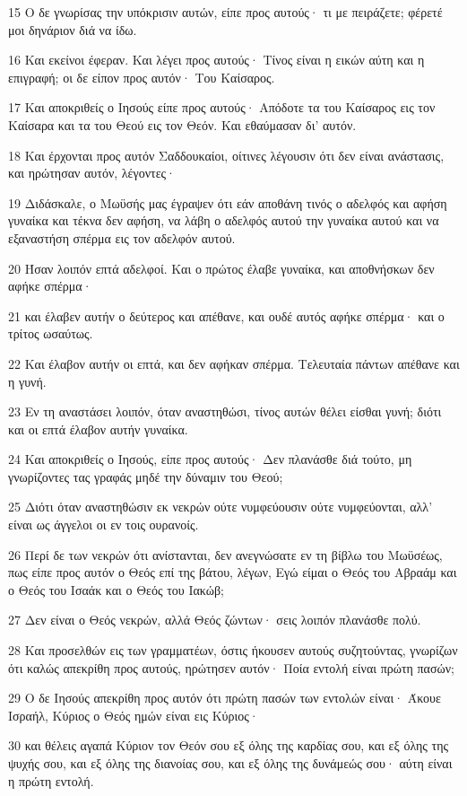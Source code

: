 \par 15 Ο δε γνωρίσας την υπόκρισιν αυτών, είπε προς αυτούς· τι με πειράζετε; φέρετέ μοι δηνάριον διά να ίδω.
\par 16 Και εκείνοι έφεραν. Και λέγει προς αυτούς· Τίνος είναι η εικών αύτη και η επιγραφή; οι δε είπον προς αυτόν· Του Καίσαρος.
\par 17 Και αποκριθείς ο Ιησούς είπε προς αυτούς· Απόδοτε τα του Καίσαρος εις τον Καίσαρα και τα του Θεού εις τον Θεόν. Και εθαύμασαν δι' αυτόν.
\par 18 Και έρχονται προς αυτόν Σαδδουκαίοι, οίτινες λέγουσιν ότι δεν είναι ανάστασις, και ηρώτησαν αυτόν, λέγοντες·
\par 19 Διδάσκαλε, ο Μωϋσής μας έγραψεν ότι εάν αποθάνη τινός ο αδελφός και αφήση γυναίκα και τέκνα δεν αφήση, να λάβη ο αδελφός αυτού την γυναίκα αυτού και να εξαναστήση σπέρμα εις τον αδελφόν αυτού.
\par 20 Ήσαν λοιπόν επτά αδελφοί. Και ο πρώτος έλαβε γυναίκα, και αποθνήσκων δεν αφήκε σπέρμα·
\par 21 και έλαβεν αυτήν ο δεύτερος και απέθανε, και ουδέ αυτός αφήκε σπέρμα· και ο τρίτος ωσαύτως.
\par 22 Και έλαβον αυτήν οι επτά, και δεν αφήκαν σπέρμα. Τελευταία πάντων απέθανε και η γυνή.
\par 23 Εν τη αναστάσει λοιπόν, όταν αναστηθώσι, τίνος αυτών θέλει είσθαι γυνή; διότι και οι επτά έλαβον αυτήν γυναίκα.
\par 24 Και αποκριθείς ο Ιησούς, είπε προς αυτούς· Δεν πλανάσθε διά τούτο, μη γνωρίζοντες τας γραφάς μηδέ την δύναμιν του Θεού;
\par 25 Διότι όταν αναστηθώσιν εκ νεκρών ούτε νυμφεύουσιν ούτε νυμφεύονται, αλλ' είναι ως άγγελοι οι εν τοις ουρανοίς.
\par 26 Περί δε των νεκρών ότι ανίστανται, δεν ανεγνώσατε εν τη βίβλω του Μωϋσέως, πως είπε προς αυτόν ο Θεός επί της βάτου, λέγων, Εγώ είμαι ο Θεός του Αβραάμ και ο Θεός του Ισαάκ και ο Θεός του Ιακώβ;
\par 27 Δεν είναι ο Θεός νεκρών, αλλά Θεός ζώντων· σεις λοιπόν πλανάσθε πολύ.
\par 28 Και προσελθών εις των γραμματέων, όστις ήκουσεν αυτούς συζητούντας, γνωρίζων ότι καλώς απεκρίθη προς αυτούς, ηρώτησεν αυτόν· Ποία εντολή είναι πρώτη πασών;
\par 29 Ο δε Ιησούς απεκρίθη προς αυτόν ότι πρώτη πασών των εντολών είναι· Άκουε Ισραήλ, Κύριος ο Θεός ημών είναι εις Κύριος·
\par 30 και θέλεις αγαπά Κύριον τον Θεόν σου εξ όλης της καρδίας σου, και εξ όλης της ψυχής σου, και εξ όλης της διανοίας σου, και εξ όλης της δυνάμεώς σου· αύτη είναι η πρώτη εντολή.
